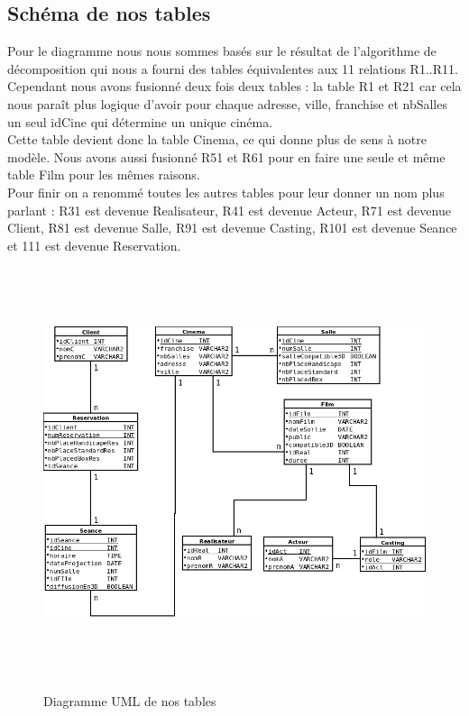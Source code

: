 \documentclass[a4paper,sffamily,12pt]{article}
\begin{document}
				\vspace{0.5cm}
			
			\subsection{Schéma de nos tables}
	
				\vspace{0.5cm}
						
			Pour le diagramme nous nous sommes basés sur le résultat de l'algorithme de décomposition qui nous a fourni des tables équivalentes aux 11 relations R1..R11. Cependant nous avons fusionné deux fois deux tables : la table R1 et R21 car cela nous paraît plus logique d'avoir pour chaque adresse, ville, franchise et nbSalles un seul idCine qui détermine un unique cinéma.\\
			\indent Cette table devient donc la table Cinema, ce qui donne plus de sens à notre modèle. Nous avons aussi fusionné R51 et R61 pour en faire une seule et même table Film pour les mêmes raisons.\\
			\indent Pour finir on a renommé toutes les autres tables pour leur donner un nom plus parlant : R31 est devenue Realisateur, R41 est devenue Acteur, R71 est devenue Client, R81 est devenue Salle, R91 est devenue Casting, R101 est devenue Seance et 111 est devenue Reservation.
	
					\begin{figure}[!h]		
						\hspace{-0.5cm}
						{\includegraphics[height=12cm]{picture/DiagrammeUML.png}}
						\caption{Diagramme UML de nos tables}
						\label{UML}
						\vspace{0.5cm}	
					\end{figure}		
	
\end{document}
